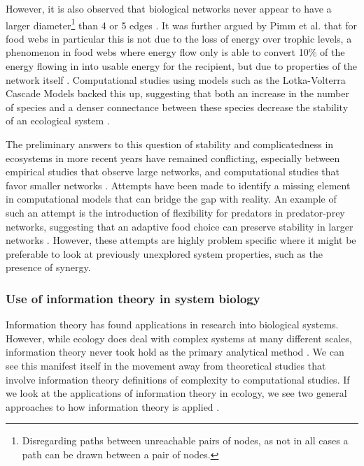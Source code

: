 \documentclass[../main.tex]{subfiles}
\begin{document}
However, it is also observed that biological networks never appear to have a larger diameter\footnote{Disregarding paths between unreachable pairs of nodes, as not in all cases a path can be drawn between a pair of nodes.} than 4 or 5 edges \cite{pimm1977number}.
It was further argued by Pimm et al. that for food webs in particular this is not due to the loss of energy over trophic levels, a phenomenon in food webs where energy flow only is able to convert 10\% of the energy flowing in into usable energy for the recipient, but due to properties of the network itself \cite{pimm1977number}.
Computational studies using models such as the Lotka-Volterra Cascade Models backed this up, suggesting that both an increase in the number of species and a denser connectance between these species decrease the stability of an ecological system \cite{chen2001global}.

The preliminary answers to this question of stability and complicatedness in ecosystems in more recent years have remained conflicting, especially between empirical studies that observe large networks, and computational studies that favor smaller networks \cite{pimm1984complexity}.
Attempts have been made to identify a missing element in computational models that can bridge the gap with reality.
An example of such an attempt is the introduction of flexibility for predators in predator-prey networks, suggesting that an adaptive food choice can preserve stability in larger networks \cite{kondoh2003foraging}.
However, these attempts are highly problem specific where it might be preferable to look at previously unexplored system properties, such as the presence of synergy. %

\subsubsection{Use of information theory in system biology}

Information theory has found applications in research into biological systems.
However, while ecology does deal with complex systems at many different scales, information theory never took hold as the primary analytical method \cite{ulanowicz2001information}. %
We can see this manifest itself in the movement away from theoretical studies that involve information theory definitions of complexity to computational studies.
If we look at the applications of information theory in ecology, we see two general approaches to how information theory is applied \cite{ulanowicz2001information}.
\end{document}
